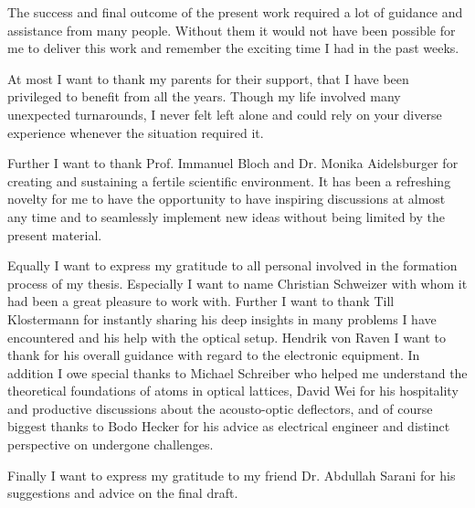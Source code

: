 
The success and final outcome of the present work required a lot of guidance
and assistance from many people. Without them it would not have been possible
for me to deliver this work and remember the exciting time I had in the past
weeks.

At most I want to thank my parents for their support, that I have been
privileged to benefit from all the years. Though my life involved many
unexpected turnarounds, I never felt left alone and could rely on your
diverse experience whenever the situation required it.

Further I want to thank Prof. Immanuel Bloch and Dr. Monika Aidelsburger for
creating and sustaining a fertile scientific environment. It has been a
refreshing novelty for me to have the opportunity to have inspiring
discussions at almost any time and to seamlessly implement new ideas without
being limited by the present material.

Equally I want to express my gratitude to all personal involved in the
formation process of my thesis. Especially I want to name Christian Schweizer
with whom it had been a great pleasure to work with. Further I want to thank
Till Klostermann for instantly sharing his deep insights in many problems I
have encountered and his help with the optical setup. Hendrik von Raven I want
to thank for his overall guidance with regard to the electronic equipment.
In addition I owe special thanks to Michael Schreiber who helped me understand
the theoretical foundations of atoms in optical lattices, David Wei for his
hospitality and productive discussions about the acousto-optic deflectors,
and of course biggest thanks to Bodo Hecker for his advice as electrical
engineer and distinct perspective on undergone challenges.

Finally I want to express my gratitude to my friend Dr. Abdullah Sarani for
his suggestions and advice on the final draft.
